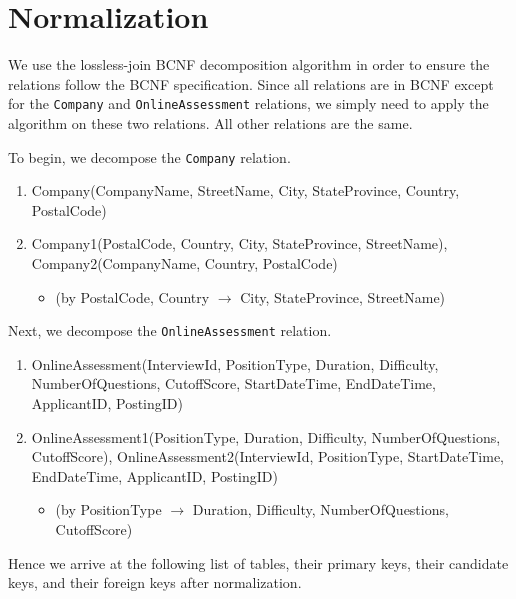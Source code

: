 \section{Normalization}

We use the lossless-join BCNF decomposition algorithm in order to ensure the relations follow the BCNF specification.
Since all relations are in BCNF except for the \texttt{Company} and \texttt{OnlineAssessment} relations, 
we simply need to apply the algorithm on these two relations. 
All other relations are the same.

To begin, we decompose the \texttt{Company} relation.

\begin{enumerate}
  \item Company(CompanyName, StreetName, City, StateProvince, Country, PostalCode)
  \item Company1(PostalCode, Country, City, StateProvince, StreetName),
    Company2(CompanyName, Country, PostalCode)
    \begin{itemize}
      \item (by PostalCode, Country $ \to $ City, StateProvince, StreetName)
    \end{itemize}
\end{enumerate}

Next, we decompose the \texttt{OnlineAssessment} relation.

\begin{enumerate}
  \item OnlineAssessment(InterviewId, PositionType, Duration, Difficulty, NumberOfQuestions, CutoffScore,
    StartDateTime, EndDateTime, ApplicantID, PostingID)
  \item OnlineAssessment1(PositionType, Duration, Difficulty, NumberOfQuestions, CutoffScore),
    OnlineAssessment2(InterviewId, PositionType, StartDateTime, EndDateTime, ApplicantID, PostingID)
    \begin{itemize}
      \item (by PositionType $ \to $ Duration, Difficulty, NumberOfQuestions, CutoffScore)
    \end{itemize}
\end{enumerate}

Hence we arrive at the following list of tables, their primary keys, their candidate keys, and their foreign keys after normalization.

